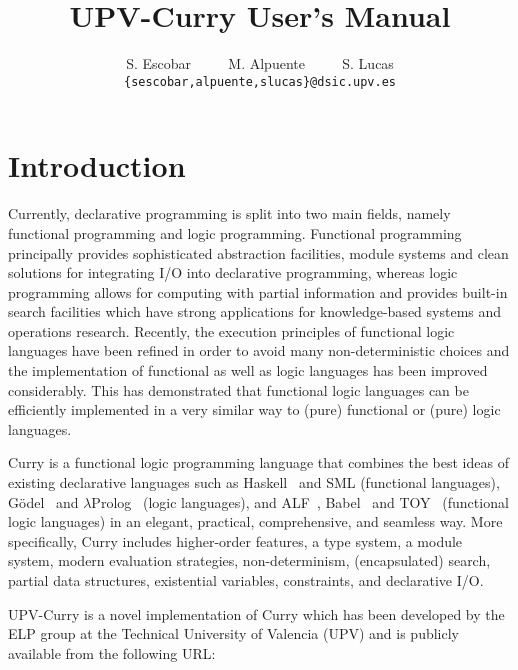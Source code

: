 \documentclass[titlepage,fleqn]{article}
\begin{document}
 

\title{UPV-Curry User's Manual}

\author{S. Escobar ~~~~ M. Alpuente ~~~~ S. Lucas\\
	{\tt\small \{sescobar,alpuente,slucas\}@dsic.upv.es} }

\maketitle

\section{Introduction}

Currently, declarative programming is split into two main fields,
namely functional programming and logic programming. 
Functional programming principally
provides sophisticated abstraction facilities,
module systems and clean solutions for integrating I/O into declarative
programming, whereas logic programming allows for 
computing with partial information and provides built-in search facilities
which have strong applications for knowledge-based systems and operations
research.
Recently, the execution principles of functional logic languages 
have been refined in order to avoid many non-deterministic choices
and the implementation of functional as well as logic languages has been
improved considerably.
This has demonstrated
that functional logic languages can be efficiently implemented 
in a very similar way 
to (pure) functional or (pure) logic languages.

Curry is a functional logic programming language 
that combines 
the best ideas of existing declarative
languages such as
Haskell~\cite{HPW92} and SML \cite{MTH90} (functional languages), 
G\"odel~\cite{HL94} and $\lambda$Prolog~\cite{NM88} (logic languages),
and ALF~\cite{HanusSchwab91Impl}, 
    Babel~\cite{KuchenAnastasiadis96} and 
    TOY~\cite{Caballero_Lopez_Sanchez_Toy_97} (functional logic languages)
in an elegant, practical,
comprehensive, and seamless way.
More specifically, Curry includes 
higher-order features, a type system,
a module system, modern evaluation strategies, non-determinism,
(encapsulated) search, partial data structures, existential variables,
constraints, and declarative I/O.

UPV-Curry is a novel implementation of Curry which 
has been developed by the ELP group  
at the Technical University of Valencia (UPV)
and is publicly available from the following URL:
\end{document}
